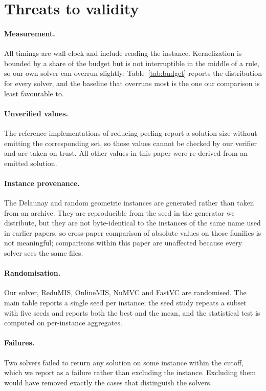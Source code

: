 \documentclass[preprint,12pt]{elsarticle}
\theoremstyle{definition}
\begin{document}


\section{Threats to validity}
\label{sec:threats}

\paragraph{Measurement.} All timings are wall-clock and include reading the
instance. Kernelization is bounded by a share of the budget but is not
interruptible in the middle of a rule, so our own solver can overrun slightly;
Table~\ref{tab:budget} reports the distribution for every solver, and the
baseline that overruns most is the one our comparison is least favourable to.

\paragraph{Unverified values.} The reference implementations of reducing-peeling
report a solution size without emitting the corresponding set, so those values
cannot be checked by our verifier and are taken on trust. All other values in
this paper were re-derived from an emitted solution.

\paragraph{Instance provenance.} The Delaunay and random geometric instances are
generated rather than taken from an archive. They are reproducible from the seed
in the generator we distribute, but they are not byte-identical to the instances
of the same name used in earlier papers, so cross-paper comparison of absolute
values on those families is not meaningful; comparisons within this paper are
unaffected because every solver sees the same files.

\paragraph{Randomisation.} Our solver, ReduMIS, OnlineMIS, NuMVC and FastVC are
randomised. The main table reports a single seed per instance; the seed study
repeats a subset with five seeds and reports both the best and the mean, and the
statistical test is computed on per-instance aggregates.

\paragraph{Failures.} Two solvers failed to return any solution on some
instance within the cutoff, which we report as a failure rather than excluding
the instance. Excluding them would have removed exactly the cases that
distinguish the solvers.
\end{document}
